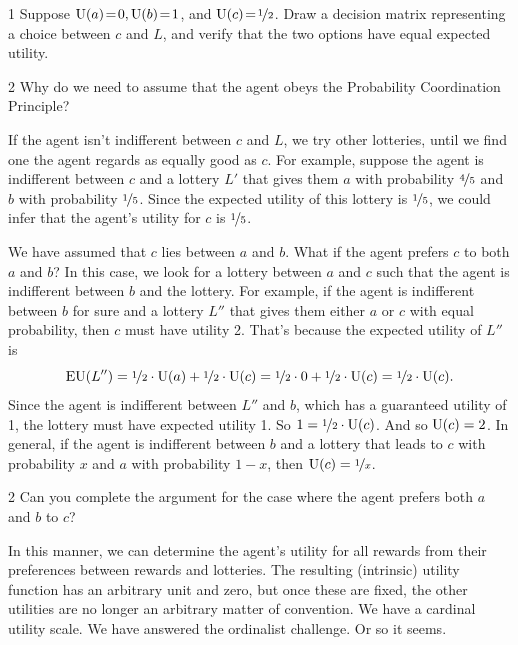 \begin{exercise}{1}
  Suppose $\text{U}(a)\!=\!0, \text{U}(b)\!=\!1$, and $\text{U}(c) \!=\! \nicefrac{1}{2}$. Draw a
  decision matrix representing a choice between $c$ and $L$, and verify that
  the two options have equal expected utility.
\end{exercise}

\begin{exercise}{2}
  Why do we need to assume that the agent obeys the Probability Coordination
  Principle?
\end{exercise}

If the agent isn't indifferent between $c$ and $L$, we try other lotteries,
until we find one the agent regards as equally good as $c$. For example, suppose
the agent is indifferent between $c$ and a lottery $L'$ that gives them $a$
with probability $\nicefrac{4}{5}$ and $b$ with probability $\nicefrac{1}{5}$.
Since the expected utility of this lottery is $\nicefrac{1}{5}$, we could infer
that the agent's utility for $c$ is $\nicefrac{1}{5}$.

We have assumed that $c$ lies between $a$ and $b$. What if the agent prefers $c$
to both $a$ and $b$? In this case, we look for a lottery between $a$ and $c$
such that the agent is indifferent between $b$ and the lottery. For example, if
the agent is indifferent between $b$ for sure and a lottery $L''$ that gives
them either $a$ or $c$ with equal probability, then $c$ must have utility 2.
That's because the expected utility of $L''$ is
\[
  \text{EU}(L'') = \nicefrac{1}{2} \cdot \text{U}(a) + \nicefrac{1}{2} \cdot \text{U}(c) =  
   \nicefrac{1}{2} \cdot 0 + \nicefrac{1}{2} \cdot \text{U}(c) = \nicefrac{1}{2} \cdot \text{U}(c). 
\]
Since the agent is indifferent between $L''$ and $b$, which has a
guaranteed utility of 1, the lottery must have expected utility 1. So
$1 = \nicefrac{1}{2} \cdot \text{U}(c)$. And so $\text{U}(c) = 2$. In general, if
the agent is indifferent between $b$ and a lottery that leads to $c$
with probability $x$ and $a$ with probability $1-x$, then
$\text{U}(c) = \nicefrac{1}{x}$.


\begin{exercise}{2}
  Can you complete the argument for the case where the agent prefers
  both $a$ and $b$ to $c$?
\end{exercise}

In this manner, we can determine the agent's utility for all rewards from their
preferences between rewards and lotteries. The resulting (intrinsic) utility
function has an arbitrary unit and zero, but once these are fixed, the other
utilities are no longer an arbitrary matter of convention. We have a cardinal
utility scale. We have answered the ordinalist challenge. Or so it seems.

